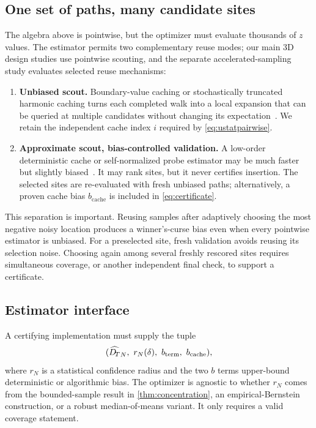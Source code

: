 \subsection{One set of paths, many candidate sites}

The algebra above is pointwise, but the optimizer must evaluate thousands of $z$ values.  The estimator permits two complementary reuse modes; our main 3D design studies use pointwise scouting, and the separate accelerated-sampling study evaluates selected reuse mechanisms:

\begin{enumerate}
  \item \textbf{Unbiased scout.}  Boundary-value caching or stochastically truncated harmonic caching turns each completed walk into a local expansion that can be queried at multiple candidates without changing its expectation~\cite{miller2023boundary,zhou2025harmonic}.  We retain the independent cache index $i$ required by \cref{eq:ustatpairwise}.
  \item \textbf{Approximate scout, bias-controlled validation.}  A low-order deterministic cache or self-normalized probe estimator may be much faster but slightly biased~\cite{huang2026probe}.  It may rank sites, but it never certifies insertion.  The selected sites are re-evaluated with fresh unbiased paths; alternatively, a proven cache bias $b_{\mathrm{cache}}$ is included in \cref{eq:certificate}.
\end{enumerate}

This separation is important.  Reusing samples after adaptively choosing the most negative noisy location produces a winner's-curse bias even when every pointwise estimator is unbiased.  For a preselected site, fresh validation avoids reusing its selection noise. Choosing again among several freshly rescored sites requires simultaneous coverage, or another independent final check, to support a certificate.

\subsection{Estimator interface}

A certifying implementation must supply the tuple
\begin{equation}
 (\widehat{\DT}_N,\ r_N(\delta),\ b_{\mathrm{term}},\ b_{\mathrm{cache}}),
 \label{eq:estimatorinterface}
\end{equation}
where $r_N$ is a statistical confidence radius and the two $b$ terms upper-bound deterministic or algorithmic bias.  The optimizer is agnostic to whether $r_N$ comes from the bounded-sample result in \cref{thm:concentration}, an empirical-Bernstein construction, or a robust median-of-means variant.  It only requires a valid coverage statement.
